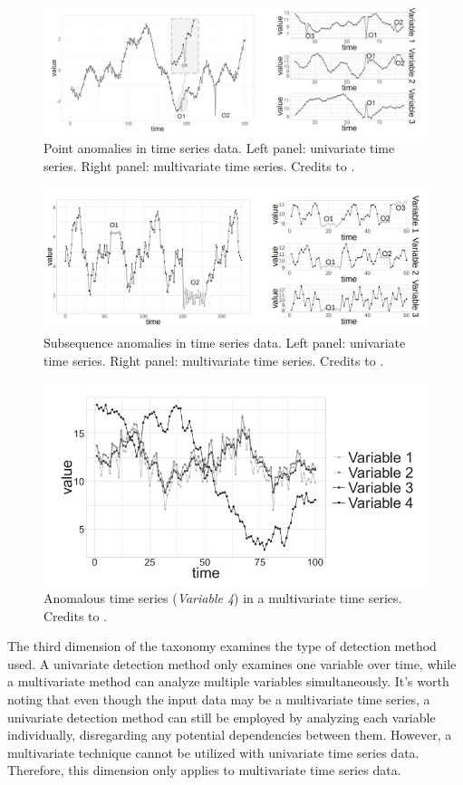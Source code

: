 \begin{figure}[t]
\centering
\includegraphics[width=1\linewidth]{figures/introduction-2/point-anomaly.png}
\caption{Point anomalies in time series data. Left panel: univariate time series. Right panel: multivariate time series. Credits to \cite{blazquez2020review}.}
\label{fig:point-anomaly}
\end{figure}
\begin{figure}[t]
\centering
\includegraphics[width=1\linewidth]{figures/introduction-2/subsequence-anomaly.png}
\caption{Subsequence anomalies in time series data. Left panel: univariate time series. Right panel: multivariate time series. Credits to \cite{blazquez2020review}.}
\label{fig:subsequence-anomaly}
\end{figure}
\begin{figure}[t]
\centering
\includegraphics[width=0.6\linewidth]{figures/introduction-2/timseries-anomaly.png}
\caption{Anomalous time series (\textit{Variable 4}) in a multivariate time series. Credits to \cite{blazquez2020review}.}
\label{fig:timseries-anomaly}
\end{figure}

The third dimension of the taxonomy examines the type of detection method used. A univariate detection method only examines one variable over time, while a multivariate method can analyze multiple variables simultaneously. It's worth noting that even though the input data may be a multivariate time series, a univariate detection method can still be employed by analyzing each variable individually, disregarding any potential dependencies between them. However, a multivariate technique cannot be utilized with univariate time series data. Therefore, this dimension only applies to multivariate time series data.

